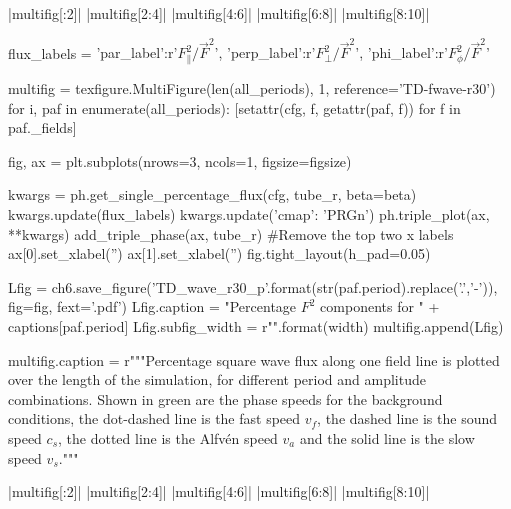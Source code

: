 \py[chapter6]|multifig[:2]|
\py[chapter6]|multifig[2:4]|
\py[chapter6]|multifig[4:6]|
\py[chapter6]|multifig[6:8]|
\py[chapter6]|multifig[8:10]|


\begin{pycode}[chapter6]
flux_labels = {'par_label':r'$F_\parallel^2 / \vec{F}^2$', 
               'perp_label':r'$F_\perp^2 / \vec{F}^2$',
               'phi_label':r'$F_\phi^2 / \vec{F}^2$'}

multifig = texfigure.MultiFigure(len(all_periods), 1, reference='TD-fwave-r30')
for i, paf in enumerate(all_periods):
    [setattr(cfg, f, getattr(paf, f)) for f in paf._fields]
    
    fig, ax = plt.subplots(nrows=3, ncols=1, figsize=figsize)
    
    kwargs = ph.get_single_percentage_flux(cfg, tube_r, beta=beta)
    kwargs.update(flux_labels)
    kwargs.update({'cmap': 'PRGn'})
    ph.triple_plot(ax, **kwargs)
    add_triple_phase(ax, tube_r)
    #Remove the top two x labels
    ax[0].set_xlabel('')
    ax[1].set_xlabel('')
    fig.tight_layout(h_pad=0.05)
    
    Lfig = ch6.save_figure('TD_wave_r30_p{}'.format(str(paf.period).replace('.','-')), fig=fig, fext='.pdf')
    Lfig.caption = "Percentage $F^2$ components for " + captions[paf.period]
    Lfig.subfig_width = r"{}\columnwidth".format(width)
    multifig.append(Lfig)

multifig.caption = r"""Percentage square wave flux along one field line is plotted over the length of the simulation, for different period and amplitude combinations. Shown in green are the phase speeds for the background conditions, the dot-dashed line is the fast speed $v_f$, the dashed line is the sound speed $c_s$, the dotted line is the Alfv\'en speed $v_a$ and the solid line is the slow speed $v_s$."""

\end{pycode}


\py[chapter6]|multifig[:2]|
\py[chapter6]|multifig[2:4]|
\py[chapter6]|multifig[4:6]|
\py[chapter6]|multifig[6:8]|
\py[chapter6]|multifig[8:10]|


